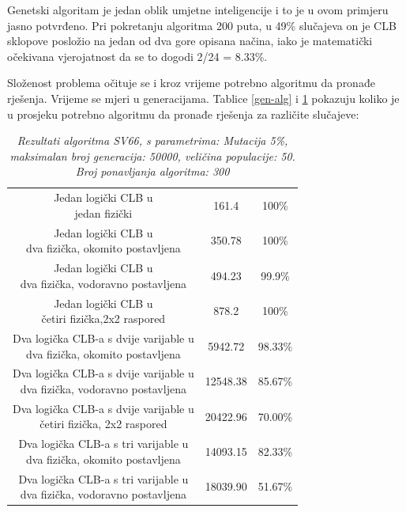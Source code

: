 \documentclass[times, utf8, zavrsni]{fer}
\begin{document}
		
		Genetski algoritam je jedan oblik umjetne inteligencije i to je u ovom primjeru jasno potvrđeno. Pri pokretanju algoritma 200 puta, u 49\% slučajeva on je CLB sklopove posložio na jedan od dva gore opisana načina, iako je matematički očekivana vjerojatnost da se to dogodi 2/24 = 8.33\%. 
				
		Složenost problema očituje se i kroz vrijeme potrebno algoritmu da pronađe rješenja. Vrijeme se mjeri u generacijama. Tablice \ref{gen-alg} i \ref{gen-alg-result} pokazuju koliko je u prosjeku potrebno algoritmu da pronađe rješenja za različite slučajeve:
		
		
		\begin{table}[htb]
			\caption{\emph{Rezultati algoritma SV66, s parametrima: Mutacija 5\%, maksimalan broj generacija: 50000, veličina populacije: 50. Broj ponavljanja algoritma: 300}}
			\label{gen-alg-result}
			\centering
			\begin{tabular}{|c | c | c|} \hline
				\thead{Opis} & \thead{Vrijeme u generacijama} & \thead{Uspješnost} \\ \hline
				\makecell{Jedan logički CLB u \\ jedan fizički } & 161.4 & 100\% \\ \hline
				\makecell{Jedan logički CLB u \\ dva fizička, okomito postavljena} & 350.78 & 100\% \\ \hline
				\makecell{Jedan logički CLB u \\ dva fizička, vodoravno postavljena} & 494.23 & 99.9\% \\ \hline
				\makecell{Jedan logički CLB u \\ četiri fizička,2x2 raspored} & 878.2 & 100\% \\ \hline
				\makecell{Dva logička CLB-a s dvije varijable u \\ dva fizička, okomito postavljena} & 5942.72 & 98.33\% \\ \hline
				\makecell{Dva logička CLB-a s dvije varijable u \\ dva fizička, vodoravno postavljena} & 12548.38 & 85.67\% \\ \hline
				\makecell{Dva logička CLB-a s dvije varijable u \\ četiri fizička, 2x2 raspored} & 20422.96 & 70.00\% \\ \hline
				\makecell{Dva logička CLB-a s tri varijable u \\ dva fizička, okomito postavljena} & 14093.15 & 82.33\% \\ \hline
				\makecell{Dva logička CLB-a s tri varijable u \\ dva fizička, vodoravno postavljena} & 18039.90 & 51.67\% \\ \hline

\end{tabular}
\end{table}
\end{document}
